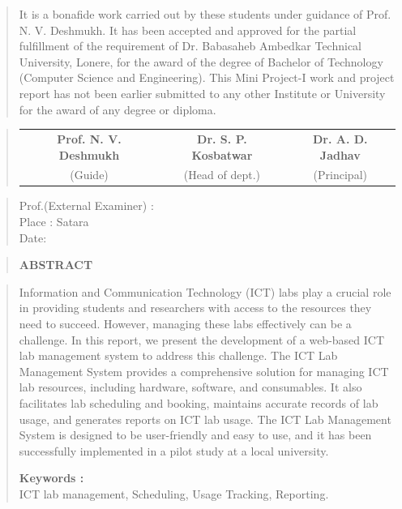 \documentclass[12pt]{report}
\begin{document}
	\vspace{-0.9cm}
	\begin{quote}
		\normalsize
		It is a bonafide work carried out by these students under guidance of
		Prof. N. V. Deshmukh. It has been accepted and approved for the partial
		fulfillment of the requirement of Dr. Babasaheb Ambedkar Technical
		University, Lonere, for the award of the degree of Bachelor of
		Technology (Computer Science and Engineering). This Mini Project-I work and project
		report has not been earlier submitted to any other Institute or University for the
		award of any degree or diploma.
	\end{quote}
	
	\begin{quote}
		\normalsize
		\centering
		\vspace{3cm}
		\begin{table}[ht]
			\centering
			\begin{tabular}{c  c  c}
				\bfseries
				Prof. N. V. Deshmukh  & \bfseries Dr. S. P. Kosbatwar & \bfseries Dr. A. D. Jadhav \\[2ex]
				(Guide) & (Head of dept.) & (Principal)\\[2ex]
			\end{tabular}
		\end{table}
	\end{quote}
	\vspace{2cm}
	\begin{quote}
		Prof.(External Examiner) :\\Place : Satara\\Date:
	\end{quote}
	\newpage
	
	
	\begin{quote}
		\centering
		\LARGE
		\textbf{ABSTRACT}
	\end{quote}
	
	
	\begin{quote}
		
		\hspace{1cm}Information and Communication Technology (ICT) labs play a crucial role in providing students and researchers with access to the resources they need to succeed. However, managing these labs effectively can be a challenge. In this report, we present the development of a web-based ICT lab management system to address this challenge. The ICT Lab Management System provides a comprehensive solution for managing ICT lab resources, including hardware, software, and consumables. It also facilitates lab scheduling and booking, maintains accurate records of lab usage, and generates reports on ICT lab usage. The ICT Lab Management System is designed to be user-friendly and easy to use, and it has been successfully implemented in a pilot study at a local university. 
		
		\textbf{Keywords :}\\[1ex]
		ICT lab management, Scheduling, Usage Tracking, Reporting.
	\end{quote}
	\clearpage
	\tableofcontents
	\newpage
	
\end{document}
